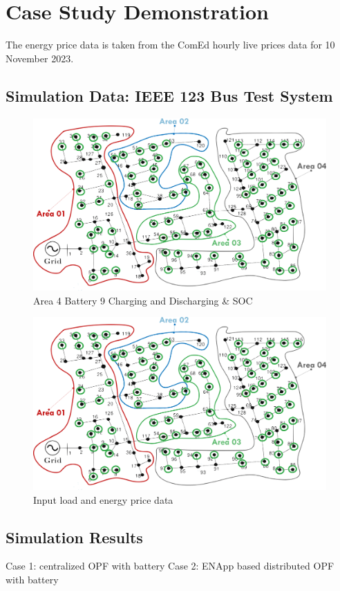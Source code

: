 \documentclass{article}
\begin{document}
\section{Case Study Demonstration}
The energy price data is taken from the ComEd hourly live prices data \cite{comedLivePrices} for 10 November 2023. 
\subsection{Simulation Data: IEEE 123 Bus Test System}

\begin{figure}[h!]
    \centering
    \includegraphics[width=\linewidth]{../figures/ieee123-FourAreas.png}
    \caption{Area 4 Battery 9 Charging and Discharging \& SOC}
    \label{fig:battery_charging_discharging}
\end{figure}


\begin{figure}[h!]
    \centering
    \includegraphics[width=\linewidth]{../figures/ieee123-FourAreas.png}
    \caption{Input load and energy price data}
    \label{fig:input_data}
\end{figure}



\subsection{Simulation Results}
Case 1: centralized OPF with battery
Case 2: ENApp based distributed OPF with battery
\end{document}
